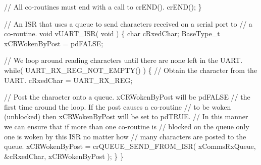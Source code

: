 \begin{DoxyPre}    // All co-routines must end with a call to crEND().
    crEND();
\}\end{DoxyPre}



\begin{DoxyPre}// An ISR that uses a queue to send characters received on a serial port to
// a co-routine.
void vUART\_ISR( void )
\{
char cRxedChar;
BaseType\_t xCRWokenByPost = pdFALSE;\end{DoxyPre}



\begin{DoxyPre}    // We loop around reading characters until there are none left in the UART.
    while( UART\_RX\_REG\_NOT\_EMPTY() )
    \{
        // Obtain the character from the UART.
        cRxedChar = UART\_RX\_REG;\end{DoxyPre}



\begin{DoxyPre}        // Post the character onto a queue.  xCRWokenByPost will be pdFALSE
        // the first time around the loop.  If the post causes a co-routine
        // to be woken (unblocked) then xCRWokenByPost will be set to pdTRUE.
        // In this manner we can ensure that if more than one co-routine is
        // blocked on the queue only one is woken by this ISR no matter how
        // many characters are posted to the queue.
        xCRWokenByPost = crQUEUE\_SEND\_FROM\_ISR( xCommsRxQueue, \&cRxedChar, xCRWokenByPost );
    \}
\}\end{DoxyPre}
 